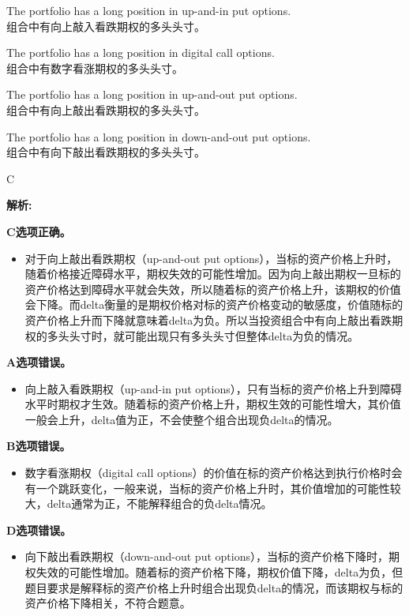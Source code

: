 \documentclass{article}
\newenvironment{explanation}
{\textbf{解析:}\par}
{\par}
\begin{document}
    \begin{choices}
        \item The portfolio has a long position in up-and-in put options.\\
        组合中有向上敲入看跌期权的多头头寸。
        \item The portfolio has a long position in digital call options.\\
        组合中有数字看涨期权的多头头寸。
        \item The portfolio has a long position in up-and-out put options.\\
        组合中有向上敲出看跌期权的多头头寸。
        \item The portfolio has a long position in down-and-out put options.\\
        组合中有向下敲出看跌期权的多头头寸。
    \end{choices}
    
    \begin{correctanswer}
        C
    \end{correctanswer}
    
    \begin{explanation}
    \textbf{C选项正确。}
    \begin{itemize}
    \item 对于向上敲出看跌期权（up-and-out put options），当标的资产价格上升时，随着价格接近障碍水平，期权失效的可能性增加。因为向上敲出期权一旦标的资产价格达到障碍水平就会失效，所以随着标的资产价格上升，该期权的价值会下降。而delta衡量的是期权价格对标的资产价格变动的敏感度，价值随标的资产价格上升而下降就意味着delta为负。所以当投资组合中有向上敲出看跌期权的多头头寸时，就可能出现只有多头头寸但整体delta为负的情况。
    \end{itemize}
    \textbf{A选项错误。}
    \begin{itemize}
    \item 向上敲入看跌期权（up-and-in put options），只有当标的资产价格上升到障碍水平时期权才生效。随着标的资产价格上升，期权生效的可能性增大，其价值一般会上升，delta值为正，不会使整个组合出现负delta的情况。
    \end{itemize}
    \textbf{B选项错误。}
    \begin{itemize}
    \item 数字看涨期权（digital call options）的价值在标的资产价格达到执行价格时会有一个跳跃变化，一般来说，当标的资产价格上升时，其价值增加的可能性较大，delta通常为正，不能解释组合的负delta情况。
    \end{itemize}
    \textbf{D选项错误。}
    \begin{itemize}
    \item 向下敲出看跌期权（down-and-out put options），当标的资产价格下降时，期权失效的可能性增加。随着标的资产价格下降，期权价值下降，delta为负，但题目要求是解释标的资产价格上升时组合出现负delta的情况，而该期权与标的资产价格下降相关，不符合题意。
    \end{itemize}
    \end{explanation}
    
\end{document}
